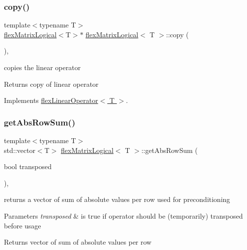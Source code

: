 \subsubsection{\texorpdfstring{copy()}{copy()}}
{\footnotesize\ttfamily template$<$typename T$>$ \\
\hyperlink{classflex_matrix_logical}{flex\+Matrix\+Logical}$<$T$>$$\ast$ \hyperlink{classflex_matrix_logical}{flex\+Matrix\+Logical}$<$ T $>$\+::copy (\begin{DoxyParamCaption}{ }\end{DoxyParamCaption})\hspace{0.3cm}{\ttfamily [inline]}, {\ttfamily [virtual]}}



copies the linear operator 

\begin{DoxyReturn}{Returns}
copy of linear operator 
\end{DoxyReturn}


Implements \hyperlink{classflex_linear_operator_a7cc1425677cc30fcbd092ffd28d508c9}{flex\+Linear\+Operator$<$ T $>$}.

\mbox{\label{classflex_matrix_logical_a0c7cf2e5dde3a2d55ae95c6e54f94342}} 
\subsubsection{\texorpdfstring{get\+Abs\+Row\+Sum()}{getAbsRowSum()}}
{\footnotesize\ttfamily template$<$typename T$>$ \\
std\+::vector$<$T$>$ \hyperlink{classflex_matrix_logical}{flex\+Matrix\+Logical}$<$ T $>$\+::get\+Abs\+Row\+Sum (\begin{DoxyParamCaption}\item[{bool}]{transposed }\end{DoxyParamCaption})\hspace{0.3cm}{\ttfamily [inline]}, {\ttfamily [virtual]}}



returns a vector of sum of absolute values per row used for preconditioning 


\begin{DoxyParams}{Parameters}
{\em transposed} & is true if operator should be (temporarily) transposed before usage \\
\hline
\end{DoxyParams}
\begin{DoxyReturn}{Returns}
vector of sum of absolute values per row 
\end{DoxyReturn}


